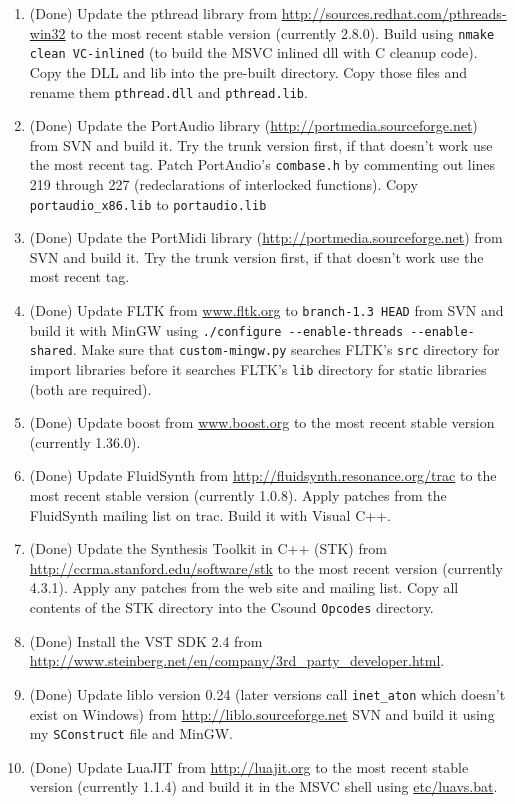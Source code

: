\documentclass[11pt,letterpaper,onecolumn]{scrartcl}
\begin{document}
\begin{sloppypar}
\begin{enumerate}
\begin{enumerate}
	    \item (Done) Update the pthread library from \url{http://sources.redhat.com/pthreads-win32} to the most recent stable version (currently 2.8.0). Build using \texttt{nmake clean VC-inlined} (to build the MSVC inlined dll with C cleanup code). Copy the DLL and lib into the pre-built directory. Copy those files and rename them \texttt{pthread.dll} and \texttt{pthread.lib}.
			\item (Done) Update the PortAudio library (\url{http://portmedia.sourceforge.net}) from SVN and build it. Try the trunk version first, if that doesn't work use the most recent tag. Patch PortAudio's \texttt{combase.h} by commenting out lines 219 through 227 (redeclarations of interlocked functions). Copy \verb|portaudio_x86.lib| to \verb|portaudio.lib|
			\item (Done) Update the PortMidi library (\url{http://portmedia.sourceforge.net}) from SVN and build it. Try the trunk version first, if that doesn't work use the most recent tag.
    	\item (Done) Update FLTK from \url{www.fltk.org} to \texttt{branch-1.3 HEAD} from SVN and build it with MinGW using \verb|./configure --enable-threads --enable-shared|. Make sure that \texttt{custom-mingw.py} searches FLTK's \texttt{src} directory for import libraries before it searches FLTK's \texttt{lib} directory for static libraries (both are required).
    	\item (Done) Update boost from \url{www.boost.org} to the most recent stable version (currently 1.36.0).
    	\item (Done) Update FluidSynth from \url{http://fluidsynth.resonance.org/trac} to the most recent stable version (currently 1.0.8). Apply patches from the FluidSynth mailing list on trac. Build it with Visual C++.
    	\item (Done) Update the Synthesis Toolkit in C++ (STK) from \url{http://ccrma.stanford.edu/software/stk} to the most recent version (currently 4.3.1). Apply any patches from the web site and mailing list. Copy all contents of the STK directory into the Csound \texttt{Opcodes} directory.
    	\item (Done) Install the VST SDK 2.4 from \url{http://www.steinberg.net/en/company/3rd_party_developer.html}.
    	\item (Done) Update liblo version 0.24 (later versions call \verb|inet_aton| which doesn't exist on Windows) from \url{http://liblo.sourceforge.net} SVN and build it using my \texttt{SConstruct} file and MinGW.
    	\item (Done) Update LuaJIT from \url{http://luajit.org} to the most recent stable version (currently 1.1.4) and build it in the MSVC shell using \url{etc/luavs.bat}.

\end{enumerate}
\end{enumerate}
\end{sloppypar}
\end{document}
